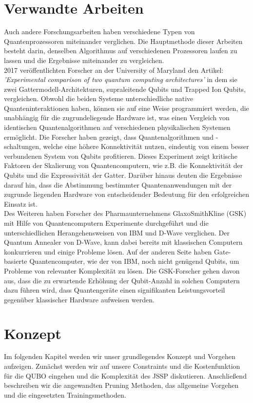 \section{Verwandte Arbeiten}
\label{sec:related}
Auch andere Forschungsarbeiten haben verschiedene Typen von Quantenprozessoren miteinander verglichen. Die Hauptmethode dieser Arbeiten besteht darin, denselben Algorithmus auf verschiedenen Prozessoren laufen zu lassen und die Ergebnisse miteinander zu vergleichen.\\
2017 veröffentlichten Forscher an der University of Maryland den Artikel: \textit{'Experimental comparison of two quantum computing architectures'} in dem sie zwei Gattermodell-Architekturen, supraleitende Qubits und Trapped Ion Qubits, vergleichen. Obwohl die beiden Systeme unterschiedliche native Quanteninteraktionen haben, können sie auf eine Weise programmiert werden, die unabhängig für die zugrundeliegende Hardware ist, was einen Vergleich von identischen Quantenalgorithmen auf verschiedenen physikalischen Systemen ermöglicht. Die Forscher haben gezeigt, dass Quantenalgorithmen und -schaltungen, welche eine höhere Konnektivität nutzen, eindeutig von einem besser verbundenen System von Qubits profitieren. Dieses  Experiment zeigt kritische Faktoren der Skalierung von Quantencomputern, wie z.B. die Konnektivität der Qubits und die Expressivität der Gatter. Darüber hinaus deuten die Ergebnisse darauf hin, dass die Abstimmung bestimmter Quantenanwendungen mit der zugrunde liegenden Hardware von entscheidender Bedeutung für den erfolgreichen Einsatz ist\cite{Linke2017}.\\
Des Weiteren haben Forscher des Pharmaunternehmens GlaxoSmithKline (GSK) mit Hilfe von Quantencomputern Experimente durchgeführt und die unterschiedlichen Herangehensweisen von IBM und D-Wave verglichen. Der  Quantum Annealer von D-Wave, kann dabei bereits mit klassischen Computern konkurrieren und einige Probleme lösen. Auf der anderen Seite haben Gate-basierte Quantencomputer, wie der von IBM, noch nicht genügend Qubits, um Probleme von relevanter Komplexität zu lösen. Die GSK-Forscher gehen davon aus, dass die zu erwartende Erhöhung der Qubit-Anzahl in solchen Computern dazu führen wird, dass Quantengeräte einen signifikanten Leistungsvorteil gegenüber klassischer Hardware aufweisen werden\cite{Fox2021}.

\section{Konzept}
\label{sec:concept}
Im folgenden Kapitel werden wir unser grundlegendes Konzept und Vorgehen aufzeigen. Zunächst werden wir auf unsere Constraints und die Kostenfunktion für die QUBO eingehen und die Komplexität des JSSP diskutieren. Anschließend beschreiben wir die angewandten Pruning Methoden, das allgemeine Vorgehen und die eingesetzten Trainingsmethoden.

